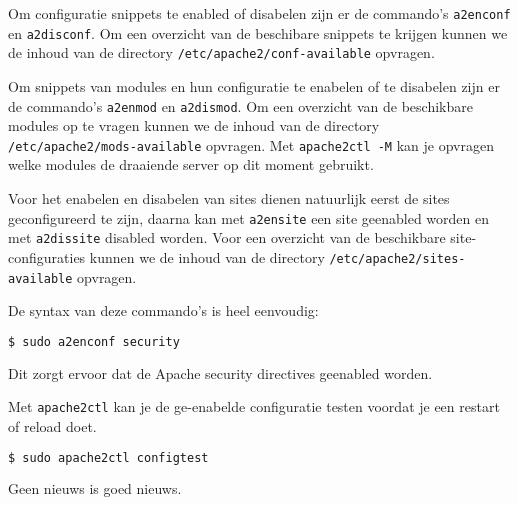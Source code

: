 Om configuratie snippets te enabled of disabelen zijn er de commando's \texttt{a2enconf} en \texttt{a2disconf}. Om een overzicht van de beschibare snippets te krijgen kunnen we de inhoud van de directory \texttt{/etc/apache2/conf-available} opvragen.

Om snippets van modules en hun configuratie te enabelen of te disabelen zijn er de commando's \texttt{a2enmod} en \texttt{a2dismod}. Om een overzicht van de beschikbare modules op te vragen kunnen we de inhoud van de directory \texttt{/etc/apache2/mods-available} opvragen. Met \texttt{apache2ctl -M} kan je opvragen welke modules de draaiende server op dit moment gebruikt.

Voor het enabelen en disabelen van sites dienen natuurlijk eerst de sites geconfigureerd te zijn, daarna kan met \texttt{a2ensite} een site geenabled worden en met \texttt{a2dissite} disabled worden. Voor een overzicht van de beschikbare site-configuraties kunnen we de inhoud van de directory \texttt{/etc/apache2/sites-available} opvragen.

De syntax van deze commando's is heel eenvoudig:
\begin{lstlisting}[language=bash]
$ sudo a2enconf security
\end{lstlisting}
Dit zorgt ervoor dat de Apache security directives geenabled worden.

Met \texttt{apache2ctl} kan je de ge-enabelde configuratie testen voordat je een restart of reload doet.
\begin{lstlisting}[language=bash]
$ sudo apache2ctl configtest
\end{lstlisting}
Geen nieuws is goed nieuws.

